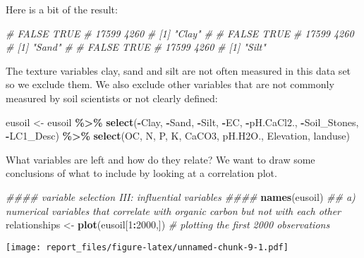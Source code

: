 \documentclass[
]{article}
\newenvironment{Shaded}{\begin{snugshade}}{\end{snugshade}}
\newcommand{\CommentTok}[1]{\textcolor[rgb]{0.56,0.35,0.01}{\textit{#1}}}
\newcommand{\DecValTok}[1]{\textcolor[rgb]{0.00,0.00,0.81}{#1}}
\newcommand{\KeywordTok}[1]{\textcolor[rgb]{0.13,0.29,0.53}{\textbf{#1}}}
\newcommand{\NormalTok}[1]{#1}
\newcommand{\OperatorTok}[1]{\textcolor[rgb]{0.81,0.36,0.00}{\textbf{#1}}}
\newcommand{\StringTok}[1]{\textcolor[rgb]{0.31,0.60,0.02}{#1}}
\begin{document}
Here is a bit of the result:

\begin{Shaded}
\begin{Highlighting}[]
\CommentTok{\# FALSE  TRUE }
\CommentTok{\# 17599  4260 }
\CommentTok{\# [1] "Clay"}
\CommentTok{\# }
\CommentTok{\# FALSE  TRUE }
\CommentTok{\# 17599  4260 }
\CommentTok{\# [1] "Sand"}
\CommentTok{\# }
\CommentTok{\# FALSE  TRUE }
\CommentTok{\# 17599  4260 }
\CommentTok{\# [1] "Silt"}
\end{Highlighting}
\end{Shaded}

The texture variables clay, sand and silt are not often measured in this
data set so we exclude them. We also exclude other variables that are
not commonly measured by soil scientists or not clearly defined:

\begin{Shaded}
\begin{Highlighting}[]
\NormalTok{eusoil <{-}}\StringTok{ }\NormalTok{eusoil }\OperatorTok{\%>\%}\StringTok{ }\KeywordTok{select}\NormalTok{(}\OperatorTok{{-}}\NormalTok{Clay, }\OperatorTok{{-}}\NormalTok{Sand, }\OperatorTok{{-}}\NormalTok{Silt, }\OperatorTok{{-}}\NormalTok{EC, }\OperatorTok{{-}}\NormalTok{pH.CaCl2., }\OperatorTok{{-}}\NormalTok{Soil\_Stones, }\OperatorTok{{-}}\NormalTok{LC1\_Desc) }\OperatorTok{\%>\%}\StringTok{ }
\StringTok{  }\KeywordTok{select}\NormalTok{(OC, N, P, K, CaCO3, pH.H2O., Elevation, landuse)}
\end{Highlighting}
\end{Shaded}

What variables are left and how do they relate? We want to draw some
conclusions of what to include by looking at a correlation plot.

\begin{Shaded}
\begin{Highlighting}[]
\CommentTok{\#\#\#\# variable selection III: influential variables \#\#\#\#}
\KeywordTok{names}\NormalTok{(eusoil)}
\CommentTok{\#\# a) numerical variables that correlate with organic carbon but not with each other}
\NormalTok{relationships <{-}}\StringTok{ }\KeywordTok{plot}\NormalTok{(eusoil[}\DecValTok{1}\OperatorTok{:}\DecValTok{2000}\NormalTok{,]) }\CommentTok{\# plotting the first 2000 observations}
\end{Highlighting}
\end{Shaded}

\texttt{[image: report\_files/figure-latex/unnamed-chunk-9-1.pdf]}
\end{document}
